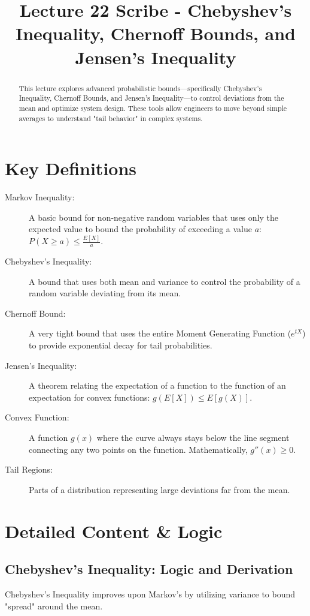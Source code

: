 \documentclass[11pt]{article}
\title{Lecture 22 Scribe - Chebyshev's Inequality, Chernoff Bounds, and Jensen's Inequality}
\date{}
\begin{document}
\maketitle

\begin{abstract}
This lecture explores advanced probabilistic bounds—specifically Chebyshev's Inequality, Chernoff Bounds, and Jensen's Inequality—to control deviations from the mean and optimize system design. These tools allow engineers to move beyond simple averages to understand "tail behavior" in complex systems.
\end{abstract}

\section{Key Definitions}
\begin{description}
    \item[Markov Inequality:] A basic bound for non-negative random variables that uses only the expected value to bound the probability of exceeding a value $a$: $P(X \ge a) \le \frac{E[X]}{a}$.
    \item[Chebyshev's Inequality:] A bound that uses both mean and variance to control the probability of a random variable deviating from its mean.
    \item[Chernoff Bound:] A very tight bound that uses the entire Moment Generating Function ($e^{tX}$) to provide exponential decay for tail probabilities.
    \item[Jensen's Inequality:] A theorem relating the expectation of a function to the function of an expectation for convex functions: $g(E[X]) \le E[g(X)]$.
    \item[Convex Function:] A function $g(x)$ where the curve always stays below the line segment connecting any two points on the function. Mathematically, $g''(x) \ge 0$.
    \item[Tail Regions:] Parts of a distribution representing large deviations far from the mean.
\end{description}

\section{Detailed Content \& Logic}

\subsection{Chebyshev's Inequality: Logic and Derivation}
Chebyshev's Inequality improves upon Markov's by utilizing variance to bound "spread" around the mean.
\end{document}
